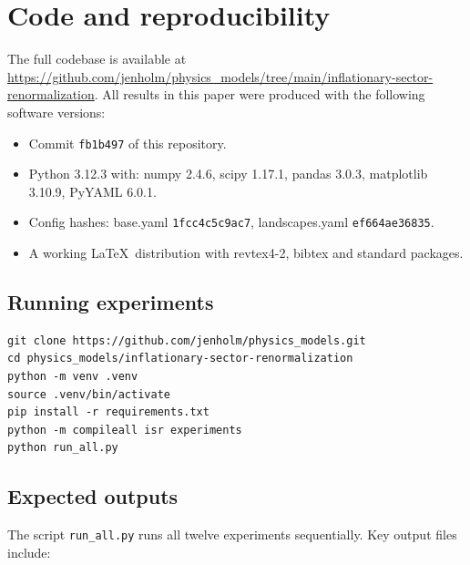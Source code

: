 \section{Code and reproducibility}
\label{app:reproducibility}

The full codebase is available at
\url{https://github.com/jenholm/physics_models/tree/main/inflationary-sector-renormalization}.
All results in this paper were produced with the following software versions:

\begin{itemize}
  \item Commit \texttt{fb1b497} of this repository.
  \item Python 3.12.3 with: numpy 2.4.6, scipy 1.17.1, pandas 3.0.3,
        matplotlib 3.10.9, PyYAML 6.0.1.
  \item Config hashes: base.yaml \texttt{1fcc4c5c9ac7},
        landscapes.yaml \texttt{ef664ae36835}.
  \item A working \LaTeX\ distribution with revtex4-2, bibtex and
        standard packages.
\end{itemize}

\subsection{Running experiments}

\begin{verbatim}
git clone https://github.com/jenholm/physics_models.git
cd physics_models/inflationary-sector-renormalization
python -m venv .venv
source .venv/bin/activate
pip install -r requirements.txt
python -m compileall isr experiments
python run_all.py
\end{verbatim}

\subsection{Expected outputs}

The script \texttt{run\_all.py} runs all twelve experiments sequentially.
Key output files include:

